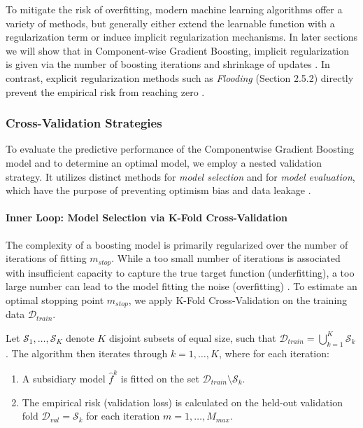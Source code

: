 \documentclass[fontsize=12 pt]{scrartcl}
\begin{document}
To mitigate the risk of overfitting, modern machine learning algorithms offer a variety of methods, but generally either extend the learnable function with a regularization term or induce implicit regularization mechanisms. In later sections we will show that in Component-wise Gradient Boosting, implicit regularization is given via the number of boosting iterations and shrinkage of updates \citep{zhang2005boosting}. In contrast, explicit regularization methods such as \textit{Flooding} (Section 2.5.2) directly prevent the empirical risk from reaching zero \citep{ishida2021flooding}.

\subsubsection{Cross-Validation Strategies}
\label{sec:cv}

To evaluate the predictive performance of the Componentwise Gradient Boosting model and to determine an optimal model, we employ a nested validation strategy. It utilizes distinct methods for \textit{model selection} and for \textit{model evaluation}, which have the purpose of preventing optimism bias and data leakage \citep{cawley2010over}.

\paragraph{Inner Loop: Model Selection via K-Fold Cross-Validation}

The complexity of a boosting model is primarily regularized over the number of iterations of fitting $m_{stop}$. While a too small number of iterations is associated with insufficient capacity to capture the true target function (underfitting), a too large number can lead to the model fitting the noise (overfitting) \citep{buhlmann2007boosting}. To estimate an optimal stopping point $m_{stop}$, we apply K-Fold Cross-Validation on the training data $\mathcal{D}_{train}$.

Let $\mathcal{S}_1, \dots, \mathcal{S}_K$ denote $K$ disjoint subsets of equal size, such that $\mathcal{D}_{train} = \bigcup_{k=1}^K \mathcal{S}_k$ \citep{kohavi1995study}. The algorithm then iterates through $k = 1, \dots, K$, where for each iteration:

\begin{enumerate}
    \item A subsidiary model $\hat{f}^{k}$ is fitted on the set $\mathcal{D}_{train} \setminus \mathcal{S}_k$.
    \item The empirical risk (validation loss) is calculated on the held-out validation fold $\mathcal{D}_{val} = \mathcal{S}_k$ for each iteration $m = 1, \dots, M_{max}$.
\end{enumerate}
\end{document}
